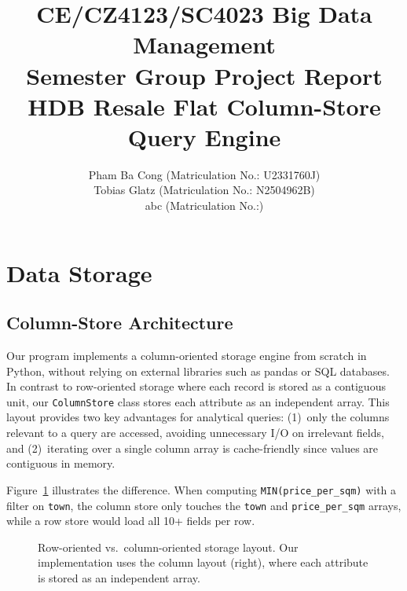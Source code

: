 \documentclass[11pt,a4paper]{article}
\title{
    \vspace{-1cm}
    \textbf{CE/CZ4123/SC4023 Big Data Management} \\[0.3cm]
    \large Semester Group Project Report \\[0.2cm]
    \large HDB Resale Flat Column-Store Query Engine
}
\author{
    Pham Ba Cong (Matriculation No.: U2331760J) \\
    Tobias Glatz (Matriculation No.: N2504962B) \\
    abc (Matriculation No.:)
}
\date{}
\begin{document}
\maketitle
\thispagestyle{empty}

\section{Data Storage}

\subsection{Column-Store Architecture}

Our program implements a column-oriented storage engine from scratch in Python, without relying on external libraries such as pandas or SQL databases. In contrast to row-oriented storage where each record is stored as a contiguous unit, our \texttt{ColumnStore} class stores each attribute as an independent array. This layout provides two key advantages for analytical queries: (1)~only the columns relevant to a query are accessed, avoiding unnecessary I/O on irrelevant fields, and (2)~iterating over a single column array is cache-friendly since values are contiguous in memory.

Figure~\ref{fig:row-vs-col} illustrates the difference. When computing \texttt{MIN(price\_per\_sqm)} with a filter on \texttt{town}, the column store only touches the \texttt{town} and \texttt{price\_per\_sqm} arrays, while a row store would load all 10+ fields per row.

\begin{figure}[H]
\centering
{}
\caption{Row-oriented vs.\ column-oriented storage layout. Our implementation uses the column layout (right), where each attribute is stored as an independent array.}
\label{fig:row-vs-col}
\end{figure}
\end{document}
